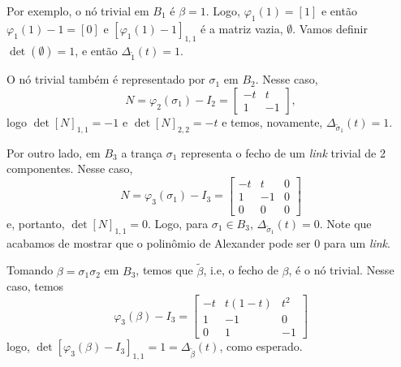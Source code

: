 	Por exemplo, o nó trivial em $B_1$ é $\beta = 1$. Logo, $\varphi_1(1) = [1]$ e então 
	$\varphi_1(1) - 1 = [0]$ e $[\varphi_1(1) - 1]_{1,1}$ é a matriz vazia, $\emptyset$. 
	Vamos definir $\det(\emptyset) = 1$, e então $\Delta_{\widetilde{1}}(t) = 1$.
	
	\par\vspace{0.3cm} O nó trivial também é representado por $\sigma_1$ em $B_2$. Nesse caso, 
	\begin{equation*}
	N = \varphi_2(\sigma_1) - I_2 = \begin{bmatrix}
	-t & t \\
	1 & -1
	\end{bmatrix},
	\end{equation*}
	logo $\det[N]_{1,1} = -1$ e $\det[N]_{2,2} = -t$ e temos, novamente, $\Delta_{\widetilde{\sigma}_1}(t) = 1$.
	
	\par\vspace{0.3cm} Por outro lado, em $B_3$ a trança $\sigma_1$ representa o fecho de um 
	\textit{link} trivial de 2 componentes. Nesse caso, 
	\begin{equation*}
    	N = \varphi_3(\sigma_1) - I_3 = \begin{bmatrix}
    	-t & t & 0 \\
    	1 & -1 & 0 \\
    	0 & 0 & 0
    	\end{bmatrix}
	\end{equation*}
	e, portanto, $\det[N]_{1,1} = 0$. Logo, para $\sigma_1\in B_3$, $\Delta_{\widetilde{\sigma}_1}(t) = 0$. 
	Note que acabamos de mostrar que o polinômio de Alexander pode ser $0$ para um \textit{link}.
	
	\par\vspace{0.3cm} Tomando $\beta = \sigma_1\sigma_2$ em $B_3$, temos que $\widetilde{\beta}$, 
	i.e, o fecho de $\beta$, é o nó trivial. Nesse caso, temos
	\begin{equation*}
    	\varphi_3(\beta) - I_3 = \begin{bmatrix}
    	-t & t(1-t) & t^2 \\
    	1 & -1 & 0 \\
    	0 & 1 & -1
    	\end{bmatrix}
	\end{equation*}
	logo, $\det[\varphi_3(\beta)-I_3]_{1,1} = 1 = \Delta_{\widetilde{\beta}}(t)$, como esperado.
	
